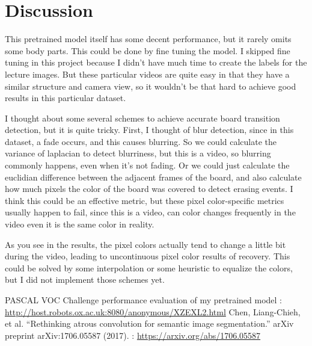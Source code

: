 \documentclass[a4paper]{article}
\begin{document}
\section{Discussion}
\begin{description}[style=nextline]
\item[How could we make semantic segmentation more accurate?]
This pretrained model itself has some decent performance, but it rarely omits some body parts. This could be done by fine tuning the model. I skipped fine tuning in this project because I didn't have much time to create the labels for the lecture images. But these particular videos are quite easy in that they have a similar structure and camera view, so it wouldn't be that hard to achieve good results in this particular dataset.
\item[How could we make board transition detection more accurate?]
I thought about some several schemes to achieve accurate board transition detection, but it is quite tricky. First, I thought of blur detection, since in this dataset, a fade occurs, and this causes blurring. So we could calculate the variance of laplacian to detect blurriness, but this is a video, so blurring commonly happens, even when it's not fading. Or we could just calculate the euclidian difference between the adjacent frames of the board, and also calculate how much pixels the color of the board was covered to detect erasing events. I think this could be an effective metric, but these pixel color-specific metrics usually happen to fail, since this is a video, can color changes frequently in the video even it is the same color in reality.
\item[How could we make recover boards more smoothly?]
As you see in the results, the pixel colors actually tend to change a little bit during the video, leading to uncontinuous pixel color results of recovery. This could be solved by some interpolation or some heuristic to equalize the colors, but I did not implement those schemes yet.
\end{description}

\begin{thebibliography}{1}
PASCAL VOC Challenge performance evaluation of my pretrained model : \url{http://host.robots.ox.ac.uk:8080/anonymous/XZEXL2.html}
Chen, Liang-Chieh, et al. “Rethinking atrous convolution for semantic image segmentation.” arXiv preprint arXiv:1706.05587 (2017). : \url{https://arxiv.org/abs/1706.05587}
\end{thebibliography}
\end{document}
